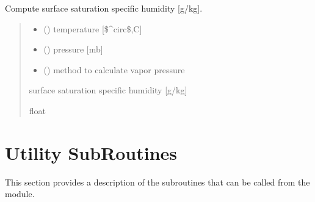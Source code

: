 \documentclass[letterpaper,10pt,english]{sphinxmanual}
\begin{document}
\begin{fulllineitems}
\label{\detokenize{users_guide:AirSeaFluxCode.hum_subs.qsat_sea}}
\pysigstartsignatures
{}
\pysigstopsignatures
\sphinxAtStartPar
Compute surface saturation specific humidity {[}g/kg{]}.
\begin{quote}\begin{description}
\begin{itemize}
\item {} 
\sphinxAtStartPar
{} () \textendash{} temperature {[}\$\textasciicircum{}circ\$,C{]}

\item {} 
\sphinxAtStartPar
{} () \textendash{} pressure {[}mb{]}

\item {} 
\sphinxAtStartPar
{} () \textendash{} method to calculate vapor pressure

\end{itemize}

\sphinxAtStartPar
{} \textendash{} surface saturation specific humidity {[}g/kg{]}

\sphinxAtStartPar
float

\end{description}\end{quote}

\end{fulllineitems}



\section{Utility Sub\sphinxhyphen{}Routines}
\label{\detokenize{users_guide:utility-sub-routines}}
\sphinxAtStartPar
This section provides a description of the sub\sphinxhyphen{}routines that can be called from the  module.
\label{\detokenize{users_guide:module-AirSeaFluxCode.util_subs}}
\end{document}

